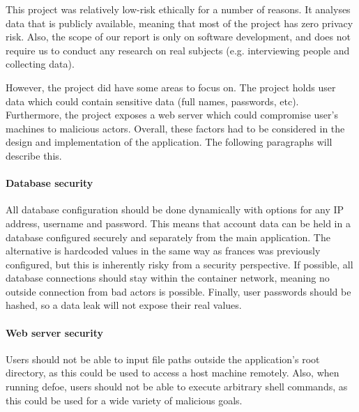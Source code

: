 \documentclass[12pt, letterpaper]{article}
\begin{document}
\begin{flushleft}
This project was relatively low-risk ethically for a number of reasons. It analyses data that is publicly available, meaning that most of the project has zero privacy risk. Also, the scope of our report is only on software development, and does not require us to conduct any research on real subjects (e.g. interviewing people and collecting data).  
\end{flushleft}

\begin{flushleft}
However, the project did have some areas to focus on. The project holds user data which could contain sensitive data (full names, passwords, etc). Furthermore, the project exposes a web server which could compromise user's machines to malicious actors. Overall, these factors had to be considered in the design and implementation of the application. The following paragraphs will describe this.
\end{flushleft}

\paragraph{Database security}

\begin{flushleft}
All database configuration should be done dynamically with options for any IP address, username and password. This means that account data can be held in a database configured securely and separately from the main application. The alternative is hardcoded values in the same way as frances was previously configured, but this is inherently risky from a security perspective. If possible, all database connections should stay within the container network, meaning no outside connection from bad actors is possible. Finally, user passwords should be hashed, so a data leak will not expose their real values.
\end{flushleft}

\paragraph{Web server security}

\begin{flushleft}
Users should not be able to input file paths outside the application's root directory, as this could be used to access a host machine remotely. Also, when running defoe, users should not be able to execute arbitrary shell commands, as this could be used for a wide variety of malicious goals.
\end{flushleft}
\end{document}
